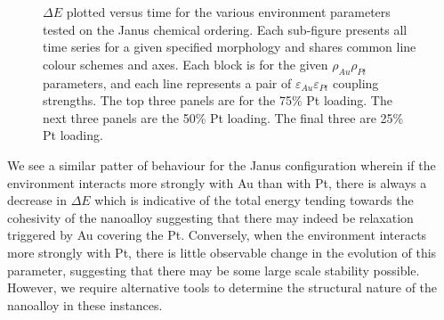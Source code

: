 \begin{figure}
\begin{subfigure}[b]{0.8\textwidth}
\end{subfigure}
    \caption{$\Delta E$ plotted versus time for the various environment parameters tested on the Janus chemical ordering. Each sub-figure presents all time series for a given specified morphology and shares common line colour schemes and axes. Each block is for the given $\rho_{Au}\rho_{Pt}$ parameters, and each line represents a pair of $\varepsilon_{Au}\varepsilon_{Pt}$ coupling strengths. The top three panels are for the 75\% Pt loading. The next three panels are the 50\% Pt loading. The final three are 25\% Pt loading.}
    \label{fig:Delta_E_Env_jan}
\end{figure}

We see a similar patter of behaviour for the Janus configuration wherein if the environment interacts more strongly with Au than with Pt, there is always a decrease in $\Delta E$ which is indicative of the total energy tending towards the cohesivity of the nanoalloy suggesting that there may indeed be relaxation triggered by Au covering the Pt. Conversely, when the environment interacts more strongly with Pt, there is little observable change in the evolution of this parameter, suggesting that there may be some large scale stability possible. However, we require alternative tools to determine the structural nature of the nanoalloy in these instances. 

